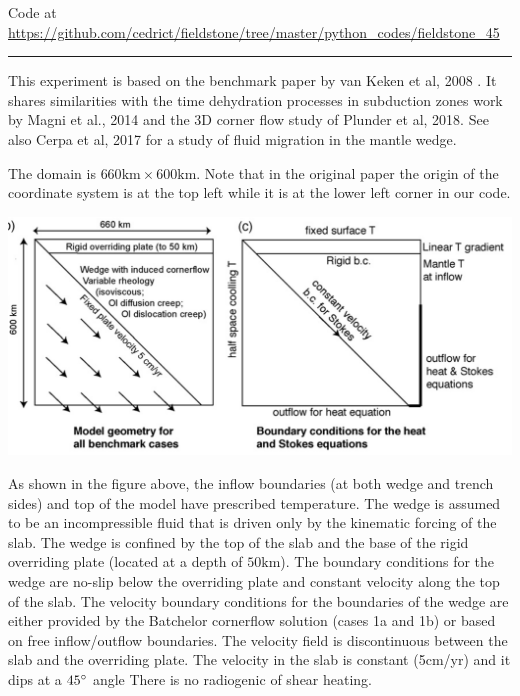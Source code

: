 

\begin{center}
Code at \url{https://github.com/cedrict/fieldstone/tree/master/python_codes/fieldstone_45}
\end{center}

\par\noindent\rule{\textwidth}{0.4pt}

This experiment is based on the benchmark paper by van Keken et al, 2008 \cite{vack08}.
It shares similarities with the 
time dehydration processes in subduction zones work by Magni et al., 2014 \cite{mabv14} and 
the 3D corner flow study of Plunder et al, 2018\cite{pltv18}. See also Cerpa et al, 2017 \cite{ceww17}
for a study of fluid migration in the mantle wedge.

The domain is $660\text{km}\times 600\text{km}$. Note that in the original paper the 
origin of the coordinate system is at the top left while it is at the lower left corner 
in our code.

\begin{center}
\includegraphics[width=14cm]{python_codes/fieldstone_45/images/setup1}
\end{center}

As shown in the figure above, 
the inflow boundaries (at both wedge and trench sides) and top of the model 
have prescribed temperature. The wedge is assumed to be an incompressible fluid that
is driven only by the kinematic forcing of the slab. The wedge is
confined by the top of the slab and the base of the rigid overriding
plate (located at a depth of $50\text{km}$). 
The boundary conditions for the wedge are no-slip below the overriding plate and constant velocity
along the top of the slab. The velocity boundary conditions for the
boundaries of the wedge are either provided by the Batchelor cornerflow 
solution (cases 1a and 1b) or based on free inflow/outflow
boundaries. The velocity field is discontinuous between the slab
and the overriding plate.
The velocity in the slab is constant (5cm/yr) and it dips at a $45\degree$ angle
There is no radiogenic of shear heating.


